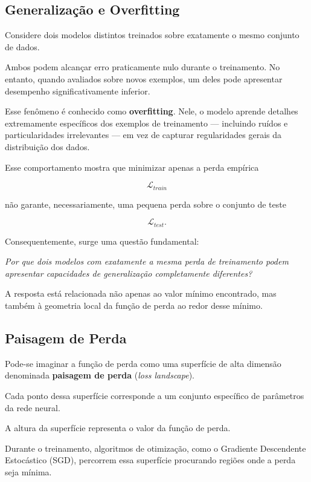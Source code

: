 \documentclass[12pt, a4paper]{article}
\begin{document}
\subsection{Generalização e Overfitting}

Considere dois modelos distintos treinados sobre exatamente o mesmo conjunto de dados.

Ambos podem alcançar erro praticamente nulo durante o treinamento. No entanto, quando avaliados sobre novos exemplos, um deles pode apresentar desempenho significativamente inferior.

Esse fenômeno é conhecido como \textbf{overfitting}. Nele, o modelo aprende detalhes extremamente específicos dos exemplos de treinamento — incluindo ruídos e particularidades irrelevantes — em vez de capturar regularidades gerais da distribuição dos dados.

Esse comportamento mostra que minimizar apenas a perda empírica

\[
\mathcal{L}_{train}
\]

não garante, necessariamente, uma pequena perda sobre o conjunto de teste

\[
\mathcal{L}_{test}.
\]

Consequentemente, surge uma questão fundamental:

\begin{center}
\textit{Por que dois modelos com exatamente a mesma perda de treinamento podem apresentar capacidades de generalização completamente diferentes?}
\end{center}

A resposta está relacionada não apenas ao valor mínimo encontrado, mas também à geometria local da função de perda ao redor desse mínimo.

\subsection{Paisagem de Perda}

Pode-se imaginar a função de perda como uma superfície de alta dimensão denominada \textbf{paisagem de perda} (\textit{loss landscape}).

Cada ponto dessa superfície corresponde a um conjunto específico de parâmetros da rede neural.

A altura da superfície representa o valor da função de perda.

Durante o treinamento, algoritmos de otimização, como o Gradiente Descendente Estocástico (SGD), percorrem essa superfície procurando regiões onde a perda seja mínima.
\end{document}
